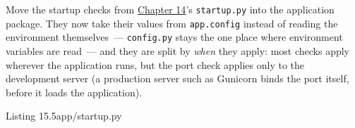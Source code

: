 Move the startup checks from \hyperref[ch:14-runtime-contract]{Chapter 14}'s \texttt{startup.py} into the application package. They now take their values from \texttt{app.config} instead of reading the environment themselves~--- \texttt{config.py} stays the one place where environment variables are read~--- and they are split by \emph{when} they apply: most checks apply wherever the application runs, but the port check applies only to the development server (a production server such as Gunicorn binds the port itself, before it loads the application).

\begin{codeboxcap}{\textcolor{accent}{Listing 15.5}\enspace app/startup.py}

\begin{Shaded}
\begin{Highlighting}[]




\OperatorTok{=}\NormalTok{ (}\NormalTok{, }\NormalTok{)}
    \OperatorTok{\textless{}}
            \SpecialCharTok{\{}\NormalTok{required[}\NormalTok{]}\SpecialCharTok{\}}\SpecialCharTok{\{}\NormalTok{required[}\NormalTok{]}\SpecialCharTok{\}}
            \SpecialCharTok{\{}\NormalTok{split()[}\NormalTok{]}\SpecialCharTok{\}}
\NormalTok{        )}


\end{Highlighting}
\end{Shaded}
\end{codeboxcap}
